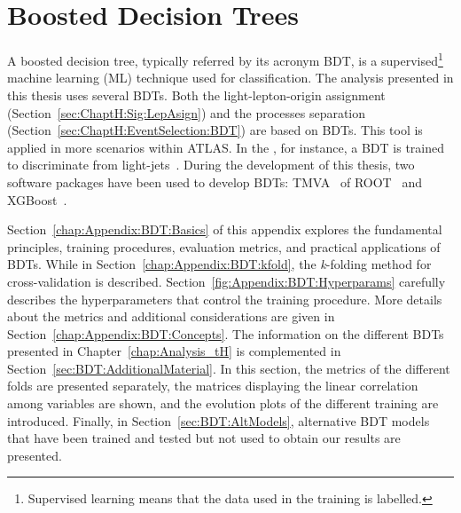\chapter{Boosted Decision Trees}
\label{chap:Appendix:BDT}



A boosted decision tree, typically referred by its acronym BDT, is a supervised\footnote{Supervised learning means that the 
data used in the training is labelled.} machine learning (ML) technique used for classification. The analysis presented in this thesis 
uses several BDTs. Both the light-lepton-origin assignment (Section~\ref{sec:ChaptH:Sig:LepAsign}) and the processes
separation (Section~\ref{sec:ChaptH:EventSelection:BDT}) are based on BDTs. This tool is applied in more scenarios 
within ATLAS. In the \btag, for instance, a BDT is trained to discriminate \bjets from light-jets~\cite{ATLAS:2019bwq}. 
During the development of this thesis, two software packages have been used to develop BDTs: TMVA~\cite{TMVAUsersGuide} of ROOT~\cite{Brun:1997pa}
and XGBoost~\cite{Chen_2016}.

Section~\ref{chap:Appendix:BDT:Basics} of this appendix explores the fundamental principles, training procedures, 
evaluation metrics, and practical applications of BDTs. While in Section~\ref{chap:Appendix:BDT:kfold}, the \textit{k}-folding
method for cross-validation is described. Section~\ref{fig:Appendix:BDT:Hyperparams} carefully describes the
hyperparameters that control the training procedure. More details about the metrics and additional considerations
are given in Section~\ref{chap:Appendix:BDT:Concepts}.
The information on the different BDTs presented in Chapter~\ref{chap:Analysis_tH} is complemented in 
Section~\ref{sec:BDT:AdditionalMaterial}. In this section, the metrics of the different folds are presented
separately, the matrices displaying the linear correlation among variables are shown, and the evolution plots
of the different training are introduced.
Finally, in Section~\ref{sec:BDT:AltModels}, alternative BDT models that have been trained and tested 
but not used to obtain our results are presented.



